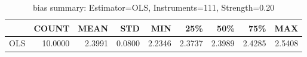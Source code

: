 \begin{table}[ht]
\centering
\caption{bias summary: Estimator=OLS, Instruments=111, Strength=0.20}
\begin{tabular}{lrrrrrrrr}
\toprule
 & COUNT & MEAN & STD & MIN & 25\% & 50\% & 75\% & MAX \\
\midrule
OLS & 10.0000 & 2.3991 & 0.0800 & 2.2346 & 2.3737 & 2.3989 & 2.4285 & 2.5408 \\
\bottomrule
\end{tabular}
\end{table}
